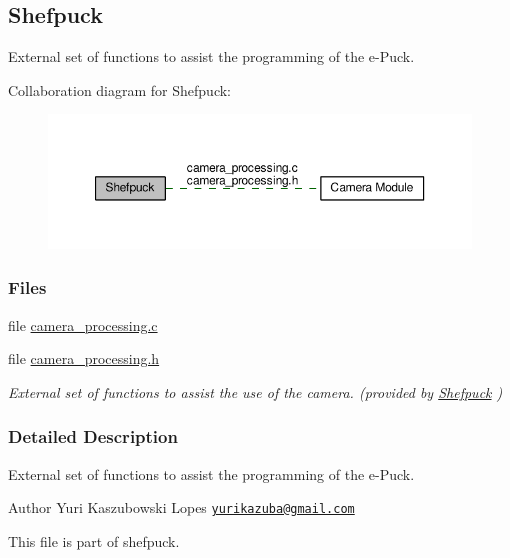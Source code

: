 \hypertarget{group__shefpuck}{}\subsection{Shefpuck}
\label{group__shefpuck}


External set of functions to assist the programming of the e-\/\+Puck.  


Collaboration diagram for Shefpuck\+:\nopagebreak
\begin{figure}[H]
\begin{center}
\leavevmode
\includegraphics[width=350pt]{d9/d96/group__shefpuck}
\end{center}
\end{figure}
\subsubsection*{Files}
\begin{DoxyCompactItemize}
\item 
file \hyperlink{camera__processing_8c}{camera\+\_\+processing.\+c}
\item 
file \hyperlink{camera__processing_8h}{camera\+\_\+processing.\+h}
\begin{DoxyCompactList}\small\item\em External set of functions to assist the use of the camera. (provided by \hyperlink{group__shefpuck}{Shefpuck} ) \end{DoxyCompactList}\end{DoxyCompactItemize}


\subsubsection{Detailed Description}
External set of functions to assist the programming of the e-\/\+Puck. 

\begin{DoxyAuthor}{Author}
Yuri Kaszubowski Lopes \href{mailto:yurikazuba@gmail.com}{\tt yurikazuba@gmail.\+com}
\end{DoxyAuthor}
This file is part of shefpuck.

